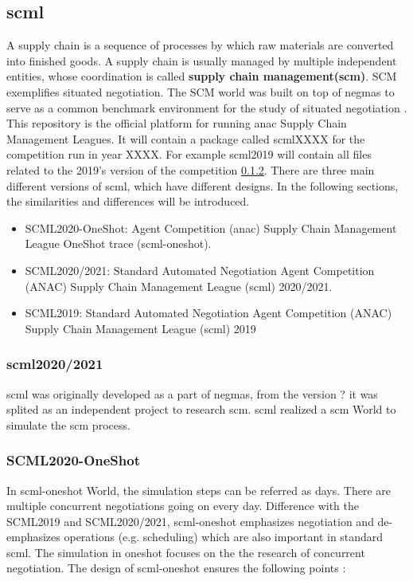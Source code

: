 \subsection{\gls{scml}} \label{background-scml}
A supply chain is a sequence of processes by which raw materials are converted into finished goods. A supply chain is usually managed by multiple independent entities, whose coordination is called \textbf{supply chain management(\gls{scm})}. SCM exemplifies situated negotiation. The SCM world was built on top of  \gls{negmas} to serve as a common benchmark environment for the study of situated negotiation \parencite{Mohammad2019}. This repository is the official platform for running \gls{anac} Supply Chain Management Leagues. It will contain a package called scmlXXXX for the competition run in year XXXX. For example scml2019 will contain all files related to the 2019’s version of the competition \ref{}.
There are three main different versions of \gls{scml}, which have different designs. In the following sections, the similarities and differences will be introduced. 

\begin{itemize}
	\item SCML2020-OneShot: Agent Competition (\gls{anac}) Supply Chain Management League OneShot trace (\gls{scml-oneshot}).
	\item SCML2020/2021: Standard Automated Negotiation Agent Competition (ANAC) Supply Chain Management League (\gls{scml}) 2020/2021.
	\item SCML2019: Standard Automated Negotiation Agent Competition (ANAC) Supply Chain Management League (\gls{scml}) 2019
\end{itemize}

\subsubsection{\gls{scml}2020/2021}
\gls{scml} was originally developed as a part of \gls{negmas}, from the version ? it was splited as an independent project to research \gls{scm}. \gls{scml} realized a \gls{scm} World to simulate the \gls{scm} process.  

\subsubsection{SCML2020-OneShot} 
In \gls{scml-oneshot} World, the simulation steps can be referred as days. There are multiple concurrent negotiations going on every day. Difference with the SCML2019 and SCML2020/2021, \gls{scml-oneshot} emphasizes negotiation and de-emphasizes operations (e.g. scheduling) which are also important in standard scml. The simulation in oneshot focuses on the the research of concurrent negotiation. The design of \gls{scml-oneshot} ensures the following points \parencite{Mohammad2021}:

